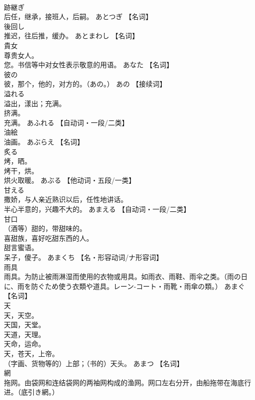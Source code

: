 \documentclass[8pt]{extreport}
\begin{document}
\begin{CJK}{UTF8}{min}
\\	跡継ぎ	
\\	后任，继承，接班人，后嗣。	あとつぎ		【名词】
\\	後回し	
\\	推迟，往后推，缓办。	あとまわし		【名词】
\\	貴女	
\\	尊贵女人。 
\\	您。书信等中对女性表示敬意的用语。	あなた		【名词】
\\	彼の	
\\	彼，那个，他的，对方的。（あの。）	あの		【接续词】
\\	溢れる	
\\	溢出，漾出；充满。 
\\	挤满。 
\\	充满。	あふれる		【自动词・一段/二类】
\\	油絵	
\\	油画。	あぶらえ		【名词】
\\	炙る	
\\	烤，晒。 
\\	烤干，烘。 
\\	烘火取暖。	あぶる		【他动词・五段/一类】
\\	甘える	
\\	撒娇，与人亲近熟识以后，任性地讲话。 
\\	半心半意的，兴趣不大的。	あまえる		【自动词・一段/二类】
\\	甘口	
\\	（酒等）甜的，带甜味的。 
\\	喜甜族，喜好吃甜东西的人。 
\\	甜言蜜语。 
\\	呆子，傻子。	あまくち		【名・形容动词/ナ形容词】
\\	雨具	
\\	雨具。为防止被雨淋湿而使用的衣物或用具。如雨衣、雨鞋、雨伞之类。（雨の日に、雨を防ぐため使う衣類や道具。レーン-コート・雨靴・雨傘の類。）	あまぐ		【名词】
\\	天	
\\	天，天空。 
\\	天国，天堂。 
\\	天道，天理。 
\\	天命，运命。 
\\	天，苍天，上帝。 
\\	（字画、货物等的）上部；（书的）天头。	あまつ		【名词】
\\	網	
\\	拖网。由袋网和连结袋网的两袖网构成的渔网。网口左右分开，由船拖带在海底行进。（底引き網。） 

\end{CJK}
\end{document}
